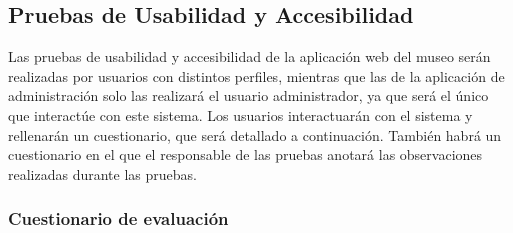 \subsection{Pruebas de Usabilidad y Accesibilidad} 
Las pruebas de usabilidad y accesibilidad de la aplicación web del museo serán realizadas por usuarios con distintos perfiles, mientras que las de la aplicación de administración solo las realizará el usuario administrador, ya que será el único que interactúe con este sistema. Los usuarios interactuarán con el sistema y rellenarán un cuestionario, que será detallado a continuación. También habrá un cuestionario en el que el responsable de las pruebas anotará las observaciones realizadas durante las pruebas.

\subsubsection{Cuestionario de evaluación}\label{sec:cuestionario-usabilidad}
